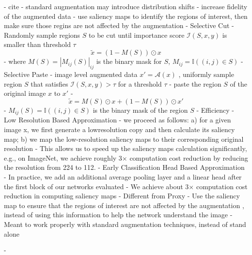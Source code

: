 - cite \cite{gongKeepAugmentSimpleInformationPreserving2021}
- standard augmentation may introduce distribution shifts
- increase fidelity of the augmented data
- use saliency maps to identify the regions of interest, then make sure those regins are not affected by the augmentation
- Selective Cut
    - Randomly sample regions $S$ to be cut until importance score $\mathcal{I}(S, x, y)$ is smaller than threshold $\tau$ 
    $$
    \tilde x= (1-M(S)) \odot x$$
    - where $M(S) = |M_{ij}(S)|_{ij}$ is the binary mask for $S$, $M_{ij} = \mathbb{I}((i,j) \in S)$
- Selective Paste
    - image level augmented data $x' = \mathcal{A}(x)$ , uniformly sample region $S$ that satisfies $\mathcal{I}(S,x,y) > \tau$ for a threshold $\tau$ 
    - paste the region $S$ of the original image  $x$ to $x'$ 
        - $$\tilde x = M(S) \odot x + (1-M(S)) \odot x'$$
        - $M_{ij}(S) = \mathbb{I}((i,j) \in S)$ is the binary mask of the region $S$
- Efficiency 
-  Low Resolution Based Approximation
    - we proceed as follows: a) for a given image x, we first generate a lowresolution copy and then calculate its saliency map; b) we map the low-resolution saliency maps to their corresponding original resolution
    - This allows us to speed up the saliency maps calculation significantly, e.g., on ImageNet, we achieve roughly 3× computation cost reduction by reducing the resolution from 224 to 112.
- Early Classification Head Based Approximation
    - In practice, we add an additional average pooling layer and a linear head after the first block of our networks evaluated
    - We achieve about 3× computation cost reduction in computing saliency maps
- Different from Proxy
 - Use the saliency map to ensure that the regions of interest are not affected by the augmentation , instead of using this information to help the network understand the image
 - Meant to work properly with standard augmentation techniques, instead of stand alone

- 

